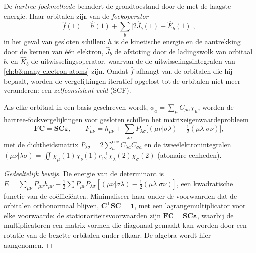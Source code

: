 \begin{definition}\label{def:b3:computational-chemistry:hartree-fock}
De \emph{hartree-fockmethode} benadert de
grondtoestand door de  met de laagste energie. Haar
orbitalen zijn  van de \emph{fockoperator}
\[
\hat f(1) = \hat h(1) + \sum_b\big[2\hat J_b(1) - \hat K_b(1)\big],
\]
in het geval van gesloten schillen: $\hat h$ is de kinetische energie en de
aantrekking door de kernen van één elektron, $\hat J_b$ de afstoting door
de ladingswolk van orbitaal $b$, en $\hat K_b$ de uitwisselingsoperator,
waarvan de  de uitwisselingsintegralen van
\cref{ch:b3:many-electron-atoms} zijn. Omdat $\hat f$ afhangt van de
orbitalen die hij bepaalt, worden de vergelijkingen iteratief opgelost tot
de orbitalen niet meer veranderen: een \emph{zelfconsistent
veld} (SCF).
\end{definition}

\begin{theorem}\label{thm:b3:computational-chemistry:roothaan}
Als elke orbitaal in een basis geschreven wordt, $\phi_a = \sum_\mu C_{\mu a}\chi_\mu$,
worden de hartree-fockvergelijkingen voor gesloten schillen het
matrixeigenwaardeprobleem
\[
\mathbf F\mathbf C = \mathbf S\mathbf C\boldsymbol\varepsilon, \qquad F_{\mu\nu} =
h_{\mu\nu} + \sum_{\lambda\sigma}P_{\lambda\sigma}\big[(\mu\nu|\sigma\lambda) -
\tfrac12(\mu\lambda|\sigma\nu)\big],
\]
met de dichtheidsmatrix $P_{\lambda\sigma} = 2\sum_a^{\mathrm{occ}}C_{\lambda a}C_{\sigma
a}$ en de tweeëlektronintegralen $(\mu\nu|\lambda\sigma) = \iint\chi_\mu(1)\chi_\nu(1)
r_{12}^{-1}\chi_\lambda(2)\chi_\sigma(2)$ (atomaire eenheden).
\end{theorem}

\begin{proof}[Gedeeltelijk bewijs]
De energie van de determinant is $E = \sum_{\mu\nu}P_{\mu\nu}h_{\mu\nu} + \frac12
\sum P_{\mu\nu}P_{\lambda\sigma}[(\mu\nu|\sigma\lambda) - \frac12(\mu\lambda|\sigma\nu)]$, een
kwadratische functie van de coëfficiënten. Minimaliseer haar onder de
voorwaarden dat de orbitalen orthonormaal blijven, $\mathbf C^{\mathsf T}\mathbf S\mathbf C = \mathbf 1$,
met een lagrangemultiplicator voor elke voorwaarde: de
stationariteitsvoorwaarden zijn $\mathbf F\mathbf C = \mathbf S\mathbf C\boldsymbol\varepsilon$, waarbij de
multiplicatoren een matrix vormen die diagonaal gemaakt kan worden door
een rotatie van de bezette orbitalen onder elkaar. De algebra wordt hier
aangenomen.
\end{proof}

